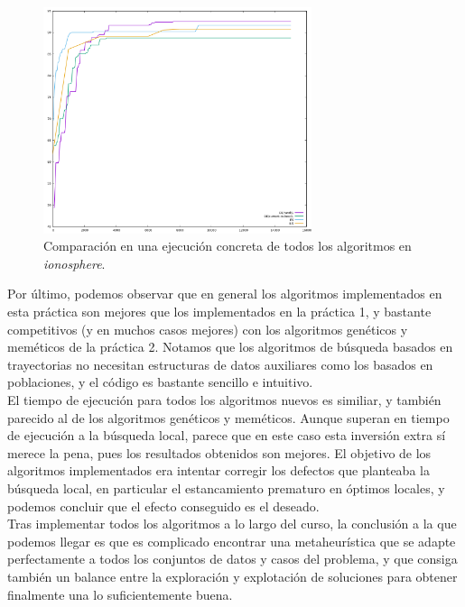 \documentclass[12pt]{article}
\begin{document}
\begin{figure}[ht!]
    \centering
    \includegraphics[width=0.7\textwidth]{img/todos.png}
	\caption{Comparación en una ejecución concreta de todos los algoritmos en \textit{ionosphere}.}
\end{figure}

Por último, podemos observar que en general los algoritmos implementados en esta práctica son mejores que los implementados en la práctica 1, y bastante competitivos (y en muchos casos mejores) con los algoritmos genéticos y meméticos de la práctica 2. Notamos que los algoritmos de búsqueda basados en trayectorias no necesitan estructuras de datos auxiliares como los basados en poblaciones, y el código es bastante sencillo e intuitivo. \\

El tiempo de ejecución para todos los algoritmos nuevos es similiar, y también parecido al de los algoritmos genéticos y meméticos. Aunque superan en tiempo de ejecución a la búsqueda local, parece que en este caso esta inversión extra sí merece la pena, pues los resultados obtenidos son mejores. El objetivo de los algoritmos implementados era intentar corregir los defectos que planteaba la búsqueda local, en particular el estancamiento prematuro en óptimos locales, y podemos concluir que el efecto conseguido es el deseado.\\

Tras implementar todos los algoritmos a lo largo del curso, la conclusión a la que podemos llegar es que es complicado encontrar una metaheurística que se adapte perfectamente a todos los conjuntos de datos y casos del problema, y que consiga también un balance entre la exploración y explotación de soluciones para obtener finalmente una lo suficientemente buena.
\end{document}
